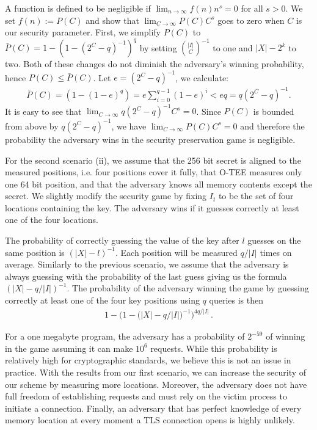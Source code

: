 \documentclass[letterpaper,twocolumn,10pt]{article}
\begin{document}
\begin{appendices}
A function is defined to be negligible if $\lim_{n \rightarrow \infty}f(n)n^s = 0$ for all $s > 0$.
We set $f(n) := P(C)$ and show that $\lim_{C \rightarrow \infty}P(C)C^s$ goes to zero when $C$ is our security parameter.
First, we simplify $P(C)$ to $\bar{P}(C) = 1 - (1 - (2^C-q)^{-1})^q$ by setting $\binom{|I|}{C}^{-1}$ to one and $|X| - 2^k$ to two.
Both of these changes do not diminish the adversary's winning probability, hence $P(C) \leq \bar{P}(C)$.
Let $e = (2^C-q)^{-1}$, we calculate:
\begin{equation*}
  \begin{split}
    \bar{P}(C) = (1 - (1 - e)^q) = e \sum_{i=0}^{q-1}(1 - e)^i < e q = q (2^C-q)^{-1}.
  \end{split}
\end{equation*}
It is easy to see that $\lim_{C \rightarrow \infty} q (2^C-q)^{-1} C^s = 0$.
Since $P(C)$ is bounded from above by $q (2^C-q)^{-1}$, we have $\lim_{C \rightarrow \infty}P(C)C^s = 0$ and therefore the probability the adversary wins in the security preservation game is negligible.

For the second scenario (ii), we assume that the 256 bit secret is aligned to the measured positions, i.e. four positions cover it fully, that O-TEE measures only one 64 bit position, and that the adversary knows all memory contents except the secret.
We slightly modify the security game by fixing $I_t$ to be the set of four locations containing the key.
The adversary wins if it guesses correctly at least one of the four locations.

The probability of correctly guessing the value of the key after $l$ guesses on the same position is $(|X| - l)^{-1}$.
Each position will be measured $q / |I|$ times on average.
Similarly to the previous scenario, we assume that the adversary is always guessing with the probability of the last guess giving us the formula $(|X| - q / |I|)^{-1}$.
The probability of the adversary winning the game by guessing correctly at least one of the four key positions using $q$ queries is then
\begin{equation*}
    \begin{split}
        1 - \Big(1 - \big(|X| - q / |I|\big)^{-1}\Big)^{4q/|I|} \,.
    \end{split}
\end{equation*}

For a one megabyte program, the adversary has a probability of $2^{-59}$ of winning in the game {assuming it can make} $10^6$ requests.
While this probability is relatively high for cryptographic standards, we believe this is not an issue in practice.
With the results from our first scenario, we can increase the security of our scheme by measuring more locations.
Moreover, the adversary does not have full freedom of establishing requests and must rely on the victim process to initiate a connection.
Finally, an adversary that has perfect knowledge of every memory location at every moment a TLS connection opens is highly unlikely.
\end{appendices}
\end{document}
